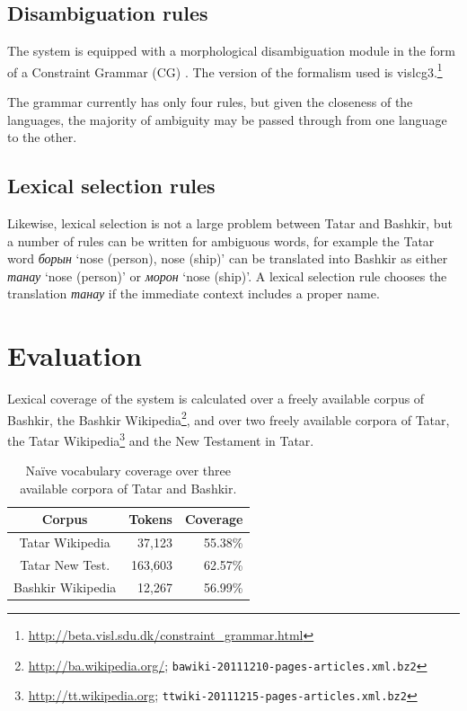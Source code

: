 \documentclass[11pt,a4paper]{article}
\begin{document}
\subsection{Disambiguation rules}

The system is equipped with a morphological disambiguation module in the form of a 
Constraint Grammar (CG) \cite{karlsson95}. The version of the formalism used is 
vislcg3.\footnote{\url{http://beta.visl.sdu.dk/constraint_grammar.html}}

The grammar currently has only four rules, but given the closeness of the languages, the 
majority of ambiguity may be passed through from one language to the other.

\subsection{Lexical selection rules}

Likewise, lexical selection is not a large problem between Tatar and Bashkir, but a 
number of rules can be written for ambiguous words, for example the Tatar 
word \emph{борын} `nose (person), nose (ship)' can be translated into Bashkir 
as either \emph{танау} `nose (person)' or \emph{морон} `nose (ship)'. A lexical selection
rule chooses the translation \emph{танау} if the immediate context includes a proper 
name.




\section{Evaluation}
\label{sec:eval}

Lexical coverage of the system is calculated over a freely available corpus of Bashkir, the Bashkir
Wikipedia\footnote{\url{http://ba.wikipedia.org/}; {\tt bawiki-20111210-pages-articles.xml.bz2}}, and over two freely available corpora of 
Tatar, the Tatar Wikipedia\footnote{\url{http://tt.wikipedia.org}; {\tt ttwiki-20111215-pages-articles.xml.bz2}} and the New Testament in Tatar.

\begin{table}
  \begin{center}
  \begin{tabular}{c|r|r}
   Corpus                  & Tokens    & Coverage\\
   \hline
   Tatar Wikipedia         & 37,123    & 55.38\% \\
   Tatar New Test.         & 163,603   & 62.57\% \\
   \hline
   Bashkir Wikipedia       & 12,267    & 56.99\% \\
   \hline
  \end{tabular}
    \caption{Na\"ive vocabulary coverage over three available corpora of Tatar and Bashkir.}
    \label{table:coverage}
  \end{center}
\end{table}
\end{document}
